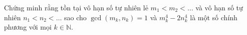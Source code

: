 \ifshowproblem
\begin{problem}\label{example:ROU-2015-SOM-J-P2}
    Chứng minh rằng tồn tại vô hạn số tự nhiên lẻ \( m_1 < m_2 < \ldots \) và vô hạn số tự nhiên \( n_1 < n_2 < \ldots \) 
    sao cho \( \gcd(m_k, n_k) = 1 \) và \( m_k^4 - 2n_k^4 \) là một số chính phương với mọi \( k \in \mathbb{N} \).
\end{problem}
\fi

\footnotemark
{}
\fi